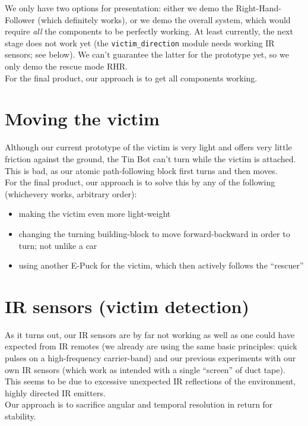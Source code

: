 \documentclass[a4paper,parskip,headheight=38pt]{scrartcl} %
\begin{document}
We only have two options for presentation: either we demo the
Right-Hand-Follower (which definitely works), or we demo the overall
system, which would require \emph{all} the components to be perfectly
working.  At least currently, the next stage does not work yet (the
\texttt{victim\_direction} module needs working IR sensors; see below).
We can't guarantee the latter for the prototype yet, so we only demo
the rescue mode RHR.
 \\
For the final product, our approach is to get all components working.

\section{Moving the victim} %

Although our current prototype of the victim is very light and offers
very little friction against the ground, the Tin Bot can't turn while
the victim is attached.  This is bad, as our atomic path-following
block first turns and then moves.
 \\
For the final product, our approach is to solve this by any of the
following (whichevery works, arbitrary order):
\begin{itemize}
    \item making the victim even more light-weight
    \item changing the turning building-block to move forward-backward
    in order to turn; not unlike a car
    \item using another E-Puck for the victim, which then actively
    follows the \enquote{rescuer}
\end{itemize}

\section{IR sensors (victim detection)}

As it turns out, our IR sensors are by far not working as well as one
could have expected from IR remotes (we already are using the same
basic principles: quick pulses on a high-frequency carrier-band) and
our previous experiments with our own IR sensors (which work as
intended with a single \enquote{screen} of duct tape).
 \\
This seems to be due to excessive unexpected IR reflections of the
environment, highly directed IR emitters.
 \\
Our approach is to sacrifice angular and temporal resolution in return
for stability.
\end{document}
